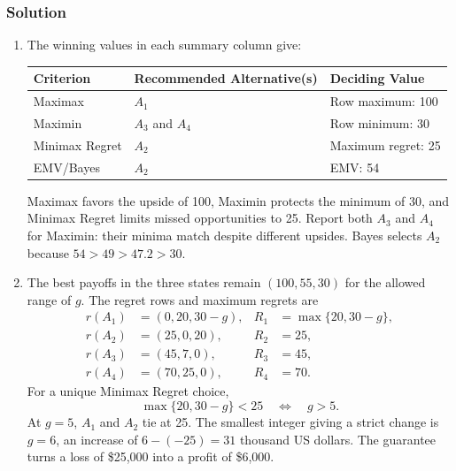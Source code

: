 
\subsubsection*{Solution}
\label{subsec:c8-ferry-solution}
\begin{enumerate}
\item The winning values in each summary column give:
\begin{center}
\begin{tabular}{lll}\toprule
Criterion & Recommended Alternative(s) & Deciding Value\\\midrule
Maximax & $A_1$ & Row maximum: 100\\
Maximin & $A_3$ and $A_4$ & Row minimum: 30\\
Minimax Regret & $A_2$ & Maximum regret: 25\\
EMV/Bayes & $A_2$ & EMV: 54\\\bottomrule
\end{tabular}
\end{center}
Maximax favors the upside of 100, Maximin protects the minimum of 30, and Minimax Regret limits missed opportunities to 25. Report both $A_3$ and $A_4$ for Maximin: their minima match despite different upsides. Bayes selects $A_2$ because $54>49>47.2>30$.
\item The best payoffs in the three states remain $(100,55,30)$ for the allowed range of $g$. The regret rows and maximum regrets are
\[
\begin{aligned}
r(A_1)&=(0,20,30-g),& R_1&=\max\{20,30-g\},\\
r(A_2)&=(25,0,20),& R_2&=25,\\
r(A_3)&=(45,7,0),& R_3&=45,\\
r(A_4)&=(70,25,0),& R_4&=70.
\end{aligned}
\]
For a unique Minimax Regret choice,
\[
\max\{20,30-g\}<25\quad\Longleftrightarrow\quad g>5.
\]
At $g=5$, $A_1$ and $A_2$ tie at 25. The smallest integer giving a strict change is $\boxed{g=6}$, an increase of $6-(-25)=31$ thousand US dollars. The guarantee turns a loss of \$25,000 into a profit of \$6,000.


\end{enumerate}
